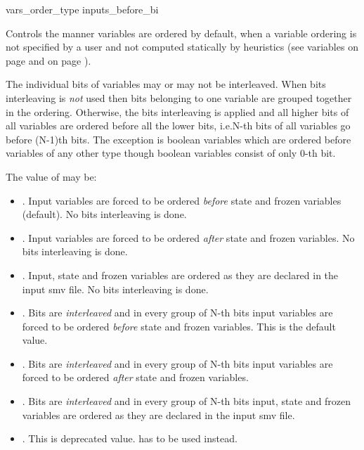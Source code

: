 \begin{nusmvVar} {vars\_order\_type}{}
    {inputs\_before\_bi}
\label{vars_order_type}

 Controls the manner variables are ordered by default, when a variable
 ordering is not specified by a user and not computed statically by
 heuristics (see variables  on page
 \pageref{input_order_file} and
  on page
 \pageref{bdd_static_order_heuristics}).

The individual bits of variables may or may not be interleaved. When
bits interleaving is \emph{not} used then bits belonging to one
variable are grouped together in the ordering.
%
Otherwise, the bits interleaving is applied and all higher bits of all
variables are ordered before all the lower bits, i.e.\@ N-th bits of
all variables go before (N-1)th bits.
%
The exception is boolean variables which are ordered before variables
of any other type though boolean variables consist of only 0-th bit.

The value of  may be:
\begin{itemize}
\item {}. Input variables are forced to be 
  ordered \emph{before} state and frozen variables (default). No bits
  interleaving is done.

\item {}. Input variables are forced to be 
  ordered \emph{after} state and frozen variables. No bits
  interleaving is done.

\item {}. Input, state and frozen variables 
  are ordered as they are declared in the input smv file.
  No bits interleaving is done.

\item {}. Bits are \emph{interleaved} and
 in every group of N-th bits input variables are forced to be ordered
 \emph{before} state and frozen variables. This is the default value.

\item {}. Bits are \emph{interleaved} and
 in every group of N-th bits input variables are forced to be 
  ordered \emph{after} state and frozen variables.

\item {}. Bits are \emph{interleaved} and
 in every group of N-th bits input, state and frozen variables 
 are ordered as they are declared in the input smv file.

\item {}. This is deprecated value.  has to be used instead.

\end{itemize}
\end{nusmvVar}

